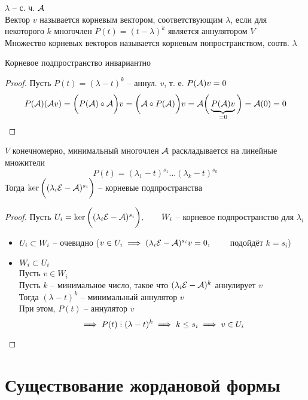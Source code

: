 \begin{definition}
	$ \lambda $ -- с. ч. $ \mathcal{A} $ \\
	Вектор $ v $ называется корневым вектором, соответствующим $ \lambda $, если для некоторого $ k $ многочлен $ P(t) = (t - \lambda)^k $ является аннулятором $ V $ \\
	Множество корневых векторов называется корневым попространством, соотв. $ \lambda $
\end{definition}

\begin{props}
	\item Корневое подпространство инвариантно
	\begin{proof}
		Пусть $ P(t) = (\lambda - t)^k $ -- аннул. $ v $, т. е. $ P(\mathcal{A})v = 0 $
		$$ P(\mathcal{A})(\mathcal{A}v) = \bigg( P(\mathcal{A}) \circ \mathcal{A} \bigg)v = \bigg( \mathcal{A} \circ P(\mathcal{A}) \bigg)v = \mathcal{A} \bigg( \underbrace{P(\mathcal{A})v}_{= 0} \bigg) = \mathcal{A}(0) = 0 $$
	\end{proof}
	\item $ V $ конечномерно, минимальный многочлен $ \mathcal{A} $ раскладывается на линейные множители
	$$ P(t) = (\lambda_1 - t)^{s_1}...(\lambda_k - t)^{s_k} $$
	Тогда $ \ker \bigg( (\lambda_i \mathcal{E} - \mathcal{A})^{s_i} \bigg) $ -- корневые подпространства
	\begin{proof}
		Пусть $ U_i = \ker \bigg( (\lambda_i \mathcal{E} - \mathcal{A})^{s_i} \bigg), \qquad W_i $ -- корневое подпространство для $ \lambda_i $
		\begin{itemize}
			\item $ U_i \subset W_i $ -- очевидно ($ v \in U_i \implies (\lambda_i \mathcal{E} - \mathcal{A})^{s_i}v = 0, \qquad $ подойдёт $ k = s_i $)
			\item $ W_i \subset U_i $ \\
			Пусть $ v \in W_i $ \\
			Пусть $ k $ -- минимальное число, такое что $ (\lambda_i \mathcal{E} - \mathcal{A})^k $ аннулирует $ v $ \\
			Тогда $ (\lambda - t)^k $ -- минимальный аннулятор $ v $ \\
			При этом, $ P(t) $ -- аннулятор $ v $
			$$ \implies P(t) \divby (\lambda - t)^k \implies k \le s_i \implies v \in U_i $$
		\end{itemize}
	\end{proof}
\end{props}

\section{Существование жордановой формы}

